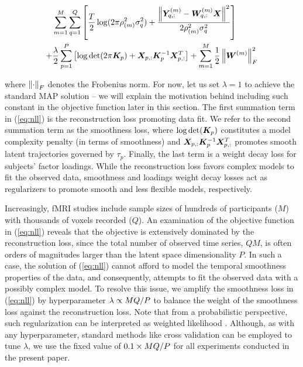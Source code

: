 \begin{align} \label{eq:nll}
    & \sum_{m=1}^{M} \sum_{q=1}^{Q} \left[ \frac{T}{2} \log(2\pi\rho_{(m)}^2\sigma_{q}^2) + \frac{\left\lVert \bm{Y}^{(m)}_{q,:} - \bm{W}^{(m)}_{q,:} \bm{X} \right\rVert^2}{2\rho_{(m)}^2\sigma_{q}^2} \right]   \\
    + & \frac{\lambda}{2} \sum_{p=1}^{P} \left[\log\det(2\pi \bm{K}_{p}) + \bm{X}_{p,:} \bm{K}_{p}^{-1} \bm{X}_{p,:}^T \right]
    + \sum_{m=1}^{M} \frac{1}{2} \left\lVert\bm{W}^{(m)}\right\rVert_F^2 
     \nonumber
\end{align}

where $\left\lVert\cdot\right\rVert_F$ denotes the Frobenius norm. For now, let us set $\lambda=1$ to achieve the standard MAP solution -- we will explain the motivation behind including such constant in the objective function later in this section. The first summation term in (\ref{eq:nll}) is the reconstruction loss promoting data fit. We refer to the second summation term as the smoothness loss, where $\log\det(\bm{K}_p)$ constitutes a model complexity penalty (in terms of smoothness) and $\bm{X}_{p,:} \bm{K}_{p}^{-1} \bm{X}_{p,:}^T$ promotes smooth latent trajectories governed by $\tau_p$. Finally, the last term is a weight decay loss for subjects' factor loadings. While the reconstruction loss favors complex models to fit the observed data, smoothness and loadings weight decay losses act as regularizers to promote smooth and less flexible models, respectively.

Increasingly, fMRI studies include sample sizes of hundreds of participants ($M$) with thousands of voxels recorded ($Q$). An examination of the objective function in (\ref{eq:nll}) reveals that the objective is extensively dominated by the reconstruction loss, since the total number of observed time series, $Q M$, is often orders of magnitudes larger than the latent space dimensionality $P$. In such a case, the solution of (\ref{eq:nll}) cannot afford to model the temporal smoothness properties of the data, and consequently, attempts to fit the observed data with a possibly complex model. To resolve this issue, we amplify the smoothness loss in (\ref{eq:nll}) by hyperparameter $\lambda \propto MQ/P$ to balance the weight of the smoothness loss against the reconstruction loss. Note that from a probabilistic perspective, such regularization can be interpreted as weighted likelihood \cite{weightedlikelihood}. Although, as with any hyperparameter, standard methods like cross validation can be employed to tune $\lambda$, we use the fixed value of $0.1 \times MQ/P$ for all experiments conducted in the present paper. 

